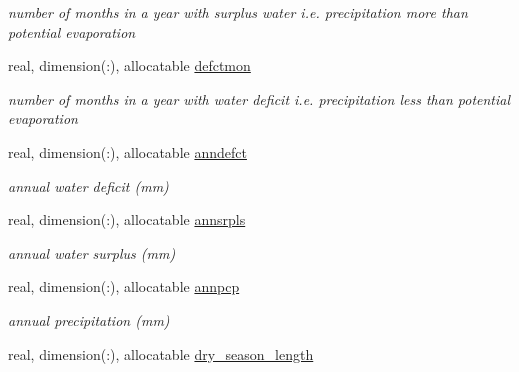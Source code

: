 \begin{DoxyCompactItemize}
\begin{DoxyCompactList}\small\item\em number of months in a year with surplus water i.\+e. precipitation more than potential evaporation \end{DoxyCompactList}\item 
\hypertarget{structctem__statevars_1_1veg__gat_aa459886f5bf5254b2ea1c5efaa169586}{}real, dimension(\+:), allocatable \hyperlink{structctem__statevars_1_1veg__gat_aa459886f5bf5254b2ea1c5efaa169586}{defctmon}\label{structctem__statevars_1_1veg__gat_aa459886f5bf5254b2ea1c5efaa169586}

\begin{DoxyCompactList}\small\item\em number of months in a year with water deficit i.\+e. precipitation less than potential evaporation \end{DoxyCompactList}\item 
\hypertarget{structctem__statevars_1_1veg__gat_acfbe5bc4153ee014ee9f2faa0811232e}{}real, dimension(\+:), allocatable \hyperlink{structctem__statevars_1_1veg__gat_acfbe5bc4153ee014ee9f2faa0811232e}{anndefct}\label{structctem__statevars_1_1veg__gat_acfbe5bc4153ee014ee9f2faa0811232e}

\begin{DoxyCompactList}\small\item\em annual water deficit (mm) \end{DoxyCompactList}\item 
\hypertarget{structctem__statevars_1_1veg__gat_a264b5bd5b9273836cdf43f10aae11716}{}real, dimension(\+:), allocatable \hyperlink{structctem__statevars_1_1veg__gat_a264b5bd5b9273836cdf43f10aae11716}{annsrpls}\label{structctem__statevars_1_1veg__gat_a264b5bd5b9273836cdf43f10aae11716}

\begin{DoxyCompactList}\small\item\em annual water surplus (mm) \end{DoxyCompactList}\item 
\hypertarget{structctem__statevars_1_1veg__gat_a3832d6dab74d31b1883490548f442c39}{}real, dimension(\+:), allocatable \hyperlink{structctem__statevars_1_1veg__gat_a3832d6dab74d31b1883490548f442c39}{annpcp}\label{structctem__statevars_1_1veg__gat_a3832d6dab74d31b1883490548f442c39}

\begin{DoxyCompactList}\small\item\em annual precipitation (mm) \end{DoxyCompactList}\item 
\hypertarget{structctem__statevars_1_1veg__gat_afd694d2842ef60fa471d031bd2ac44f5}{}real, dimension(\+:), allocatable \hyperlink{structctem__statevars_1_1veg__gat_afd694d2842ef60fa471d031bd2ac44f5}{dry\+\_\+season\+\_\+length}\label{structctem__statevars_1_1veg__gat_afd694d2842ef60fa471d031bd2ac44f5}


\end{DoxyCompactItemize}
